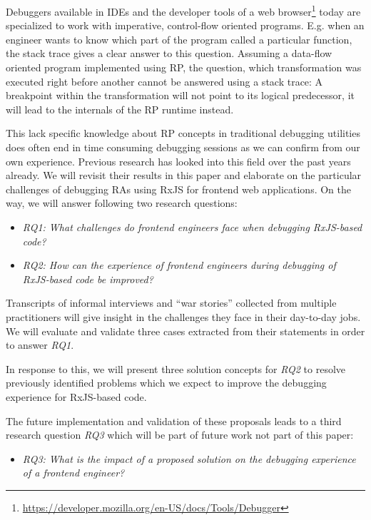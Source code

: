 \documentclass[12pt,a4paper]{article}
\begin{document}
Debuggers available in IDEs and the developer tools of a web browser\footnote{\url{https://developer.mozilla.org/en-US/docs/Tools/Debugger}} today are specialized to work with imperative, control-flow oriented programs. E.g. when an engineer wants to know which part of the program called a particular function, the stack trace gives a clear answer to this question. Assuming a data-flow oriented program implemented using RP, the question, which transformation was executed right before another cannot be answered using a stack trace: A breakpoint within the transformation will not point to its logical predecessor, it will lead to the internals of the RP runtime instead.

This lack specific knowledge about RP concepts in traditional debugging utilities does often end in time consuming debugging sessions as we can confirm from our own experience. Previous research has looked into this field \cite{10.1145/2577080.2577083} \cite{10.1145/2884781.2884815} \cite{10.1145/3180155.3180156} over the past years already. We will revisit their results in this paper and elaborate on the particular challenges of debugging RAs using RxJS for frontend web applications. On the way, we will answer following two research questions:

\begin{itemize}
	\item \emph{RQ1: What challenges do frontend engineers face when debugging RxJS-based code?}
	\item \emph{RQ2: How can the experience of frontend engineers during debugging of RxJS-based code be improved?}
\end{itemize}

Transcripts of informal interviews and ``war stories'' collected from multiple practitioners will give insight in the challenges they face in their day-to-day jobs. We will evaluate and validate three cases extracted from their statements in order to answer \emph{RQ1}.

In response to this, we will present three solution concepts for \emph{RQ2} to resolve previously identified problems which we expect to improve the debugging experience for RxJS-based code.

The future implementation and validation of these proposals leads to a third research question \emph{RQ3} which will be part of future work not part of this paper:

\begin{itemize}
	\item \emph{RQ3: What is the impact of a proposed solution on the debugging experience of a frontend engineer?}
\end{itemize}
\end{document}
